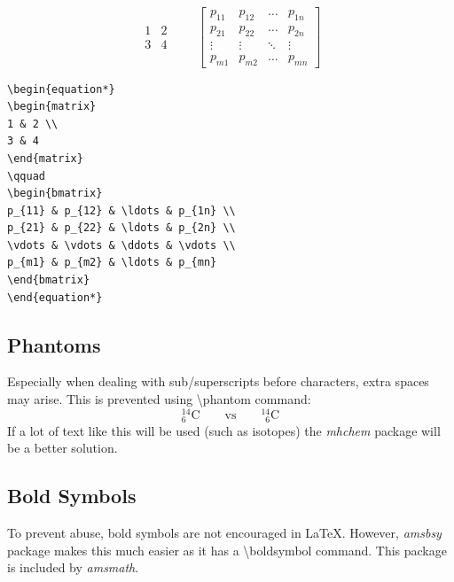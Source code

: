 \documentclass[10pt, a4paper]{article}
\begin{document}
\begin{equation*}
\begin{matrix}
1 & 2 \\
3 & 4
\end{matrix}
\qquad
\begin{bmatrix}
p_{11} & p_{12} & \ldots & p_{1n} \\
p_{21} & p_{22} & \ldots & p_{2n} \\
\vdots & \vdots & \ddots & \vdots \\
p_{m1} & p_{m2} & \ldots & p_{mn}
\end{bmatrix}
\end{equation*}
\begin{verbatim}
\begin{equation*}
\begin{matrix}
1 & 2 \\
3 & 4
\end{matrix}
\qquad
\begin{bmatrix}
p_{11} & p_{12} & \ldots & p_{1n} \\
p_{21} & p_{22} & \ldots & p_{2n} \\
\vdots & \vdots & \ddots & \vdots \\
p_{m1} & p_{m2} & \ldots & p_{mn}
\end{bmatrix}
\end{equation*}
\end{verbatim}
\subsection{Phantoms}
Especially when dealing with sub/superscripts before characters, extra spaces may arise. This is prevented using \textbackslash phantom command:
\begin{equation*}
{}^{14}_6\text{C} \qquad \text{vs} \qquad {}^{14}_{\phantom{1}6}\text{C}
\end{equation*}
If a lot of text like this will be used (such as isotopes) the \emph{mhchem} package will be a better solution.
\subsection{Bold Symbols}
To prevent abuse, bold symbols are not encouraged in \LaTeX. However, \emph{amsbsy} package makes this much easier as it has a \textbackslash boldsymbol command. This package is included by \emph{amsmath}.
\end{document}
